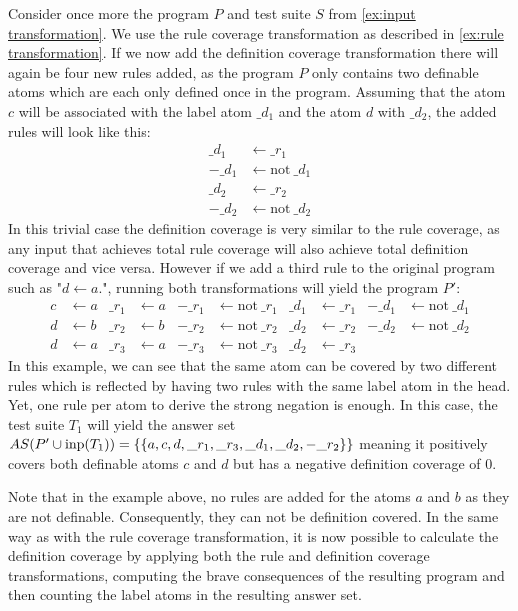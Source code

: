 \begin{example}
\label{ex:definition transformation}
    Consider once more the program $P$ and test suite $S$ from \cref{ex:input transformation}. We use the rule coverage transformation as described in \cref{ex:rule transformation}. If we now add the definition coverage transformation there will again be four new rules added, as the program $P$ only contains two definable atoms which are each only defined once in the program. Assuming that the atom $c$ will be associated with the label atom $\_d_1$ and the atom $d$ with $\_d_2$, the added rules will look like this:
    \begin{align*}
        \_d_1 &\leftarrow \_r_1 \\
        -\_d_1 &\leftarrow \text{not}\ \_d_1 \\
        \_d_2 &\leftarrow \_r_2 \\
        -\_d_2 &\leftarrow \text{not}\ \_d_2
    \end{align*}
    In this trivial case the definition coverage is very similar to the rule coverage, as any input that achieves total rule coverage will also achieve total definition coverage and vice versa. However if we add a third rule to the original program such as "\(d \leftarrow a.\)", running both transformations will yield the program $P'$:
    \begin{align*}
        c &\leftarrow a      &  \_r_1 &\leftarrow a   & -\_r_1 &\leftarrow \text{not}\ \_r_1   &  \_d_1 &\leftarrow \_r_1     &   -\_d_1 &\leftarrow \text{not}\ \_d_1 \\
        d &\leftarrow b      &  \_r_2 &\leftarrow b   & -\_r_2 &\leftarrow \text{not}\ \_r_2   &  \_d_2 &\leftarrow \_r_2     &   -\_d_2 &\leftarrow \text{not}\ \_d_2 \\
        d &\leftarrow a      &  \_r_3 &\leftarrow a   & -\_r_3 &\leftarrow \text{not}\ \_r_3   &  \_d_2 &\leftarrow \_r_3 
    \end{align*}
    In this example, we can see that the same atom can be covered by two different rules which is reflected by having two rules with the same label atom in the head. Yet, one rule per atom to derive the strong negation is enough. In this case, the test suite $T_1$ will yield the answer set \(AS(P' \cup \operatorname{inp}(T_1)) = \{\{a, c, d, \_r_1, \_r_3, \_d_1, \_d_2, -\_r_2\}\}\) meaning it positively covers both definable atoms $c$ and $d$ but has a negative definition coverage of 0.
\end{example}

Note that in the example above, no rules are added for the atoms $a$ and $b$ as they are not definable. Consequently, they can not be definition covered. In the same way as with the rule coverage transformation, it is now possible to calculate the definition coverage by applying both the rule and definition coverage transformations, computing the brave consequences of the resulting program and then counting the label atoms in the resulting answer set.

